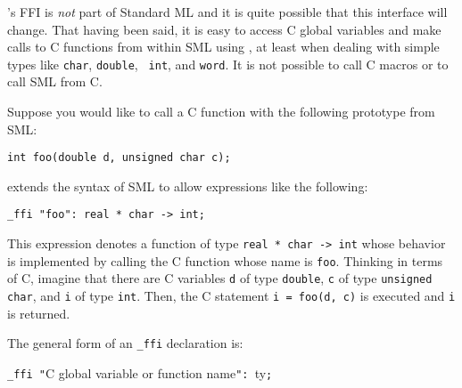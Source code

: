 
{\mlton}'s FFI is {\em not} part of Standard ML and it is quite possible that
this interface will change.  That having been said, it is easy to access C
global variables and make calls to C functions from within SML using {\mlton},
at least when dealing with simple types like {\tt char}, {\tt double}, {\tt
int}, and {\tt word}.  It is not possible to call C macros or to call SML from
C.

Suppose you would like to call a C function with the following prototype
from SML:
\begin{verbatim}
int foo(double d, unsigned char c);
\end{verbatim}
{\mlton} extends the syntax of SML to allow expressions like the following:
\begin{verbatim}
_ffi "foo": real * char -> int;
\end{verbatim}
This expression denotes a function of type {\tt real * char -> int}
whose behavior is implemented by calling the C function whose name is
{\tt foo}.  Thinking in terms of C, imagine that there are C
variables {\tt d} of type {\tt double}, {\tt c} of type {\tt unsigned
char}, and {\tt i} of type {\tt int}.  Then, the C statement
\mbox{\tt i = foo(d, c)} is executed and {\tt i} is returned.

The general form of an \verb+_ffi+ declaration is:
\begin{center}
{\tt \_ffi "}C global variable or function name{\tt ": }ty{\tt ;}
\end{center}

